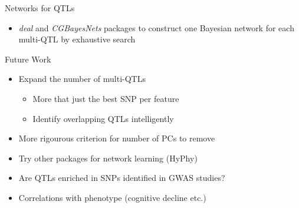 \documentclass{beamer}
\begin{document}
\begin{frame}{Networks for QTLs}
    \begin{itemize}
        \item \textit{deal} and \textit{CGBayesNets} packages to construct one
            Bayesian network for each multi-QTL by exhaustive search
    \end{itemize}
    \begin{center}
        
    \end{center}
\end{frame}
\tikzexternalenable

\begin{frame}{Future Work}
    \begin{itemize}
        \item Expand the number of multi-QTLs
            \begin{itemize}
                \item More that just the best SNP per feature
                \item Identify overlapping QTLs intelligently
            \end{itemize}
        \item More rigourous criterion for number of PCs to remove
        \item Try other packages for network learning (HyPhy)
        \item Are QTLs enriched in SNPs identified in GWAS studies?
        \item Correlations with phenotype (cognitive decline etc.)
    \end{itemize}
\end{frame}
\end{document}
